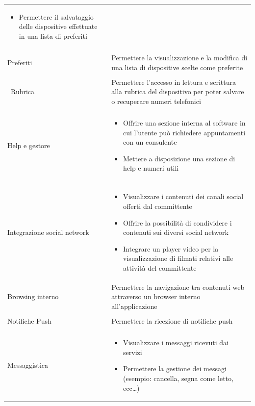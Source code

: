 \begin{center}
\begin{longtable}{p{6cm}|p{8cm}}
\begin{itemize}
                                        \item Permettere il salvataggio delle dispositive effettuate in una lista di preferiti
                                       \end{itemize}\\\\
    Preferiti & Permettere la visualizzazione e la modifica di una lista di dispositive scelte come preferite\\\\\
    Rubrica & Permettere l'accesso in lettura e scrittura alla rubrica del dispositivo per poter salvare o recuperare numeri telefonici\\\\
    
    Help e gestore & \begin{itemize}
                      \item Offrire una sezione interna al software in cui l'utente può richiedere appuntamenti con un consulente
                      \item Mettere a disposizione una sezione di help e numeri utili
                     \end{itemize}\\\\

    Integrazione social network & \begin{itemize}
                                   \item Visualizzare i contenuti dei canali social offerti dal committente
                                   \item Offrire la possibilità di condividere i contenuti sui diversi social network
				   \item Integrare un player video per la visualizzazione di filmati relativi alle attività del committente
                                  \end{itemize}\\
     Browsing interno & Permettere la navigazione tra contenuti web attraverso un browser interno all'applicazione\\\\
     Notifiche Push & Permettere la ricezione di notifiche push\\\\
     Messaggistica		 & \begin{itemize}
                                   \item Visualizzare i messaggi ricevuti dai servizi
                                   \item Permettere la gestione dei messagi (esempio: cancella, segna come letto, ecc\dots)
                                  \end{itemize}\\
    \bottomrule

    \end{longtable}
\end{center}

